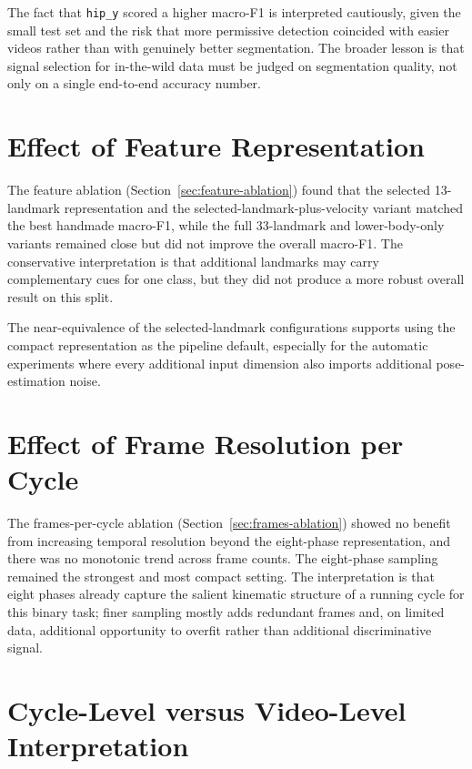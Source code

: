 The fact that \texttt{hip\_y} scored a higher macro-F1 is interpreted cautiously, given the
small test set and the risk that more permissive detection coincided with
easier videos rather than with genuinely better segmentation. The broader
lesson is that signal selection for in-the-wild data must be judged on
segmentation quality, not only on a single end-to-end accuracy number.

\section{Effect of Feature Representation}
\label{sec:disc-feature}

The feature ablation (Section~\ref{sec:feature-ablation}) found that the
selected 13-landmark representation and the selected-landmark-plus-velocity
variant matched the best handmade macro-F1, while the full 33-landmark and
lower-body-only variants remained close but did not improve the overall
macro-F1. The conservative interpretation is that additional landmarks may
carry complementary cues for one class, but they did not produce a more robust
overall result on this split.

The near-equivalence of the selected-landmark
configurations supports using the compact representation as the pipeline
default, especially for the automatic experiments where every additional input
dimension also imports additional pose-estimation noise. 
\section{Effect of Frame Resolution per Cycle}
\label{sec:disc-frames}

The frames-per-cycle ablation (Section~\ref{sec:frames-ablation}) showed no
benefit from increasing temporal resolution beyond the eight-phase
representation, and there was no monotonic trend across frame counts. The
eight-phase sampling remained the strongest and most compact setting. The
interpretation is that eight phases already capture the salient kinematic
structure of a running cycle for this binary task; finer sampling mostly adds
redundant frames and, on limited data, additional opportunity to overfit rather
than additional discriminative signal.


\section{Cycle-Level versus Video-Level Interpretation}
\label{sec:disc-cycle-video}

